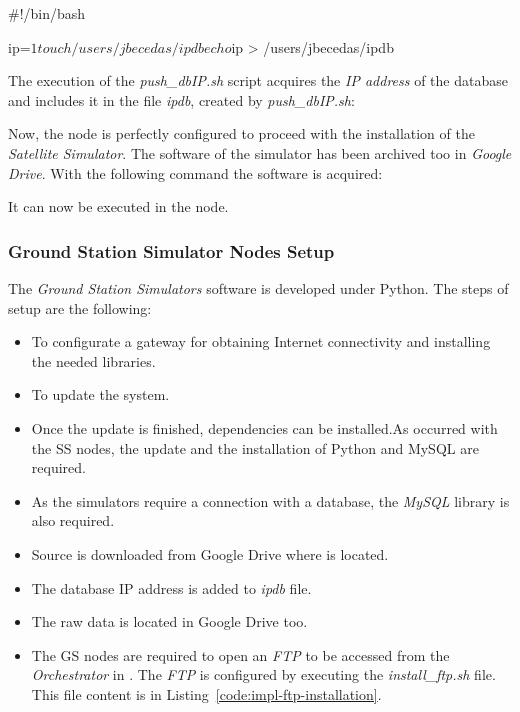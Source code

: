 \begin{listing}[
  float=h!,
  caption  = {Bash script to write the Database's\emph{IP address} on a file},
  label    = code:impl-script-ipdb,
  style=customc]

#!/bin/bash

ip=$1

touch /users/jbecedas/ipdb
echo $ip > /users/jbecedas/ipdb
\end{listing}

The execution of the \emph{push\_dbIP.sh} script acquires the \emph{IP address} of the database and includes it in the file \emph{ipdb}, created by \emph{push\_dbIP.sh}:


Now, the node is perfectly configured to proceed with the installation of the \emph{Satellite Simulator}. The software of the simulator has been archived too in \emph{Google Drive}. With the following command the software is acquired:

It can now be executed in the node.


\subsubsection{Ground Station Simulator Nodes Setup}


The \emph{Ground Station Simulators} software is developed under Python. The steps of
setup are the following:
\begin{itemize}
\item To configurate a gateway for obtaining Internet connectivity and installing the
  needed libraries.
\item To update the system.
\item Once the update is finished, dependencies can be installed.As occurred with the SS nodes, the update and the installation of Python and MySQL are required.
\item As the simulators require a connection with a database, the \emph{MySQL} library is
  also required. 
\item Source is downloaded from Google Drive where is located.
\item The database IP address is added to \emph{ipdb} file.
\item  The raw data is located in Google Drive too.  
\item The GS nodes are required to open an \emph{FTP} to be accessed from the
\emph{Orchestrator} in \bonfire. The \emph{FTP} is configured by executing the
\emph{install\_ftp.sh} file. This file content is in Listing~\ref{code:impl-ftp-installation}.  
\end{itemize}

